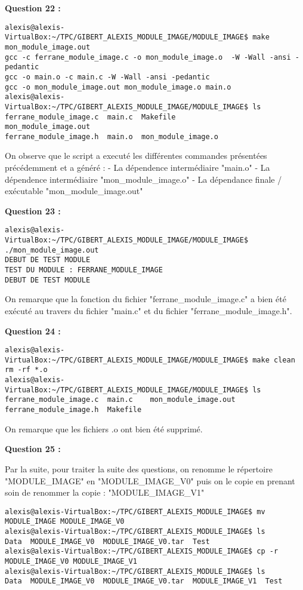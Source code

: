 \documentclass[11pt]{article}
\begin{document}
\textbf{Question 22 :}

\begin{verbatim}
alexis@alexis-VirtualBox:~/TPC/GIBERT_ALEXIS_MODULE_IMAGE/MODULE_IMAGE$ make mon_module_image.out
gcc -c ferrane_module_image.c -o mon_module_image.o  -W -Wall -ansi -pedantic
gcc -o main.o -c main.c -W -Wall -ansi -pedantic
gcc -o mon_module_image.out mon_module_image.o main.o
alexis@alexis-VirtualBox:~/TPC/GIBERT_ALEXIS_MODULE_IMAGE/MODULE_IMAGE$ ls
ferrane_module_image.c  main.c  Makefile            mon_module_image.out
ferrane_module_image.h  main.o  mon_module_image.o
\end{verbatim}

On observe que le script a executé les différentes commandes présentées
précédemment et a généré : - La dépendence intermédiaire "main.o" - La
dépendence intermédiaire "mon\_module\_image.o" - La dépendance finale /
exécutable "mon\_module\_image.out"

\textbf{Question 23 :}

\begin{verbatim}
alexis@alexis-VirtualBox:~/TPC/GIBERT_ALEXIS_MODULE_IMAGE/MODULE_IMAGE$ ./mon_module_image.out
DEBUT DE TEST MODULE 
TEST DU MODULE : FERRANE_MODULE_IMAGE
DEBUT DE TEST MODULE 
\end{verbatim}

On remarque que la fonction du fichier "ferrane\_module\_image.c" a bien
été exécuté au travers du fichier "main.c" et du fichier
"ferrane\_module\_image.h".

\textbf{Question 24 :}

\begin{verbatim}
alexis@alexis-VirtualBox:~/TPC/GIBERT_ALEXIS_MODULE_IMAGE/MODULE_IMAGE$ make clean
rm -rf *.o
alexis@alexis-VirtualBox:~/TPC/GIBERT_ALEXIS_MODULE_IMAGE/MODULE_IMAGE$ ls
ferrane_module_image.c  main.c    mon_module_image.out
ferrane_module_image.h  Makefile
\end{verbatim}

On remarque que les fichiers .o ont bien été supprimé.

\textbf{Question 25 :}

Par la suite, pour traiter la suite des questions, on renomme le
répertoire "MODULE\_IMAGE" en "MODULE\_IMAGE\_V0" puis on le copie en
prenant soin de renommer la copie : "MODULE\_IMAGE\_V1"

\begin{verbatim}
alexis@alexis-VirtualBox:~/TPC/GIBERT_ALEXIS_MODULE_IMAGE$ mv MODULE_IMAGE MODULE_IMAGE_V0
alexis@alexis-VirtualBox:~/TPC/GIBERT_ALEXIS_MODULE_IMAGE$ ls
Data  MODULE_IMAGE_V0  MODULE_IMAGE_V0.tar  Test
alexis@alexis-VirtualBox:~/TPC/GIBERT_ALEXIS_MODULE_IMAGE$ cp -r MODULE_IMAGE_V0 MODULE_IMAGE_V1
alexis@alexis-VirtualBox:~/TPC/GIBERT_ALEXIS_MODULE_IMAGE$ ls
Data  MODULE_IMAGE_V0  MODULE_IMAGE_V0.tar  MODULE_IMAGE_V1  Test
\end{verbatim}
\end{document}
